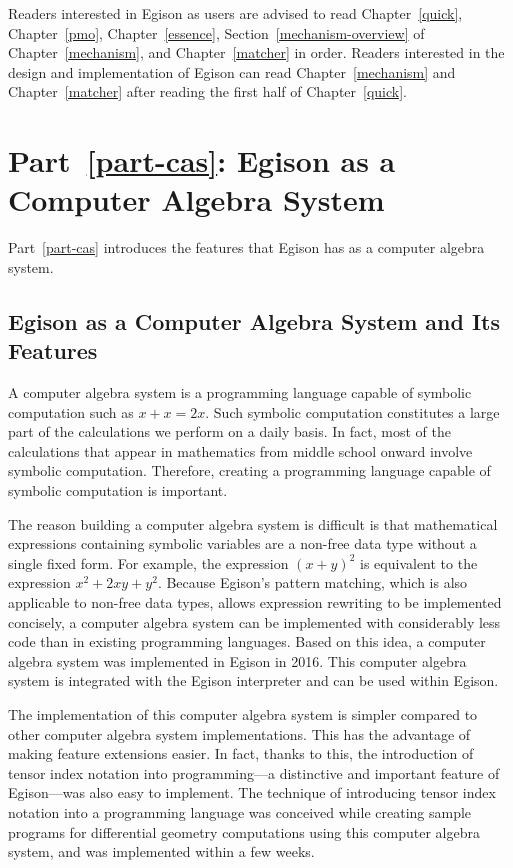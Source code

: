 Readers interested in Egison as users are advised to read Chapter~\ref{quick}, Chapter~\ref{pmo}, Chapter~\ref{essence}, Section~\ref{mechanism-overview} of Chapter~\ref{mechanism}, and Chapter~\ref{matcher} in order.
Readers interested in the design and implementation of Egison can read Chapter~\ref{mechanism} and Chapter~\ref{matcher} after reading the first half of Chapter~\ref{quick}.

\section{Part~\ref{part-cas}: Egison as a Computer Algebra System}\label{intro-cas}

Part~\ref{part-cas} introduces the features that Egison has as a computer algebra system.

\subsection{Egison as a Computer Algebra System and Its Features}

A computer algebra system is a programming language capable of symbolic computation such as $x + x = 2 x$.
Such symbolic computation constitutes a large part of the calculations we perform on a daily basis.
In fact, most of the calculations that appear in mathematics from middle school onward involve symbolic computation.
Therefore, creating a programming language capable of symbolic computation is important.

The reason building a computer algebra system is difficult is that mathematical expressions containing symbolic variables are a non-free data type without a single fixed form.
For example, the expression $(x + y)^2$ is equivalent to the expression $x^2 + 2 x y + y^2$.
Because Egison's pattern matching, which is also applicable to non-free data types, allows expression rewriting to be implemented concisely, a computer algebra system can be implemented with considerably less code than in existing programming languages.
Based on this idea, a computer algebra system was implemented in Egison in 2016.
This computer algebra system is integrated with the Egison interpreter and can be used within Egison.

The implementation of this computer algebra system is simpler compared to other computer algebra system implementations.
This has the advantage of making feature extensions easier.
In fact, thanks to this, the introduction of tensor index notation into programming---a distinctive and important feature of Egison---was also easy to implement.
The technique of introducing tensor index notation into a programming language was conceived while creating sample programs for differential geometry computations using this computer algebra system, and was implemented within a few weeks.

